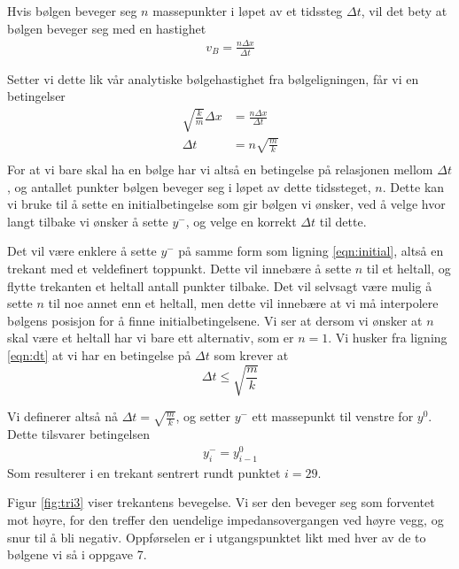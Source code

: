 \documentclass[12p,a4paper]{report}
\begin{document}
Hvis bølgen beveger seg $n$ massepunkter i løpet av et tidssteg $\Delta t$, vil det bety at bølgen beveger seg med en hastighet
\begin{align*}
v_B = \frac{n\Delta x}{\Delta t}
\end{align*}

Setter vi dette lik vår analytiske bølgehastighet fra bølgeligningen, får vi en betingelser
\begin{align*}
\sqrt{\frac{k}{m}}\Delta x &= \frac{n\Delta x}{\Delta t}\\
\Delta t &= n\sqrt{\frac{m}{k}}\\
\end{align*}
For at vi bare skal ha en bølge har vi altså en betingelse på relasjonen mellom $\Delta t$, og antallet punkter bølgen beveger seg i løpet av dette tidssteget, $n$. Dette kan vi bruke til å sette en initialbetingelse som gir bølgen vi ønsker, ved å velge hvor langt tilbake vi ønsker å sette $y^-$, og velge en korrekt $\Delta t$ til dette.

Det vil være enklere å sette $y^-$ på samme form som ligning \ref{eqn:initial}, altså en trekant med et veldefinert toppunkt. Dette vil innebære å sette $n$ til et heltall, og flytte trekanten et heltall antall punkter tilbake. Det vil selvsagt være mulig å sette $n$ til noe annet enn et heltall, men dette vil innebære at vi må interpolere bølgens posisjon for å finne initialbetingelsene. Vi ser at dersom vi ønsker at $n$ skal være et heltall har vi bare ett alternativ, som er $n=1$. Vi husker fra ligning \ref{eqn:dt} at vi har en betingelse på $\Delta t$ som krever at
\[\Delta t \leq \sqrt{\frac{m}{k}} \]

Vi definerer altså nå $\Delta t = \sqrt{\frac{m}{k}}$, og setter $y^-$ ett massepunkt til venstre for $y^0$. Dette tilsvarer betingelsen
\begin{align*}
y_i^- = y_{i-1}^0
\end{align*}
Som resulterer i en trekant sentrert rundt punktet $i = 29$.

Figur \ref{fig:tri3} viser trekantens bevegelse. Vi ser den beveger seg som forventet mot høyre, for den treffer den uendelige impedansovergangen ved høyre vegg, og snur til å bli negativ. Oppførselen er i utgangspunktet likt med hver av de to bølgene vi så i oppgave 7.
\end{document}
